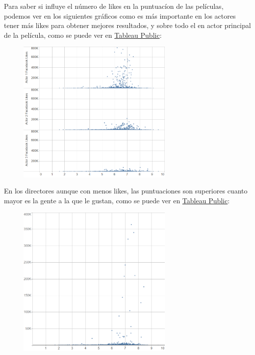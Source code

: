 \documentclass{article}
\begin{document}
\clearpage

Para saber si influye el número de likes en la puntuacíon de las películas, podemos ver en los siguientes gráficos como es más importante en los actores tener más likes para obtener mejores resultados, y sobre todo el en actor principal de la película, como se puede ver en \href{https://public.tableau.com/profile/javier6580\#!/vizhome/proyecto_fin_de_master_dataset/likes_actors_rating}{Tableau Public}:

\begin{figure}[h]
\centering
\includegraphics[width=3in,clip,keepaspectratio]{./images/likes_actors_rating}
\end{figure}

En los directores aunque con menos likes, las puntuaciones son superiores cuanto mayor es la gente a la que le gustan, como se puede ver en \href{https://public.tableau.com/profile/javier6580\#!/vizhome/proyecto_fin_de_master_dataset/likes_director_rating}{Tableau Public}:

\begin{figure}[h]
\centering
\includegraphics[width=3in,clip,keepaspectratio]{./images/likes_director_rating}
\end{figure}
\end{document}
